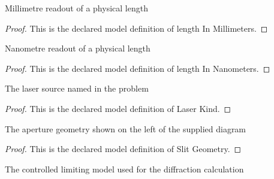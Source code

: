 \begin{definition}
  \label{def:physics:phyx-mini-0249:phyxminiproblems-problemphyxmini0249-lengthinmillimeters}
  Millimetre readout of a physical length
\end{definition}
\begin{proof}
  This is the declared model definition of length In Millimeters.
\end{proof}
\begin{definition}
  \label{def:physics:phyx-mini-0249:phyxminiproblems-problemphyxmini0249-lengthinnanometers}
  Nanometre readout of a physical length
\end{definition}
\begin{proof}
  This is the declared model definition of length In Nanometers.
\end{proof}
\begin{definition}
  \label{def:physics:phyx-mini-0249:phyxminiproblems-problemphyxmini0249-laserkind}
  The laser source named in the problem
\end{definition}
\begin{proof}
  This is the declared model definition of Laser Kind.
\end{proof}
\begin{definition}
  \label{def:physics:phyx-mini-0249:phyxminiproblems-problemphyxmini0249-slitgeometry}
  The aperture geometry shown on the left of the supplied diagram
\end{definition}
\begin{proof}
  This is the declared model definition of Slit Geometry.
\end{proof}
\begin{definition}
  \label{def:physics:phyx-mini-0249:phyxminiproblems-problemphyxmini0249-opticalregime}
  The controlled limiting model used for the diffraction calculation
\end{definition}
